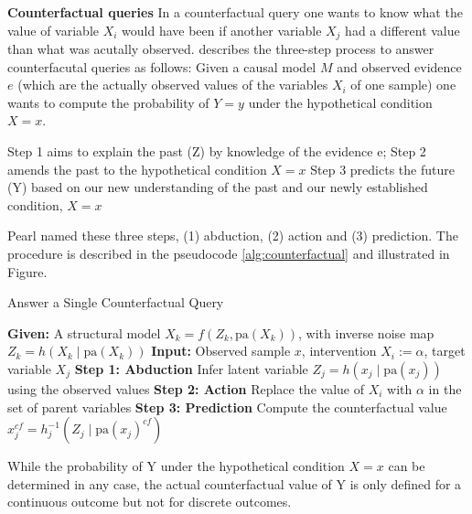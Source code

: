 \textbf{Counterfactual queries} In a counterfactual query one wants to know what the value of variable $X_i$ would have been if another variable $X_j$ had a different value than what was acutally observed. \citet{pearl_book2009} describes the three-step process to answer counterfacutal queries as follows: Given a causal model $M$ and observed evidence $e$ (which are the actually observed values of the variables $X_i$ of one sample) one wants to compute the probability of $Y=y$ under the hypothetical condition $X=x$.

Step 1 aims to explain the past (Z) by knowledge of the evidence e; 
Step 2 amends the past to the hypothetical condition $X=x$ 
Step 3 predicts the future (Y) based on our new understanding of the past and our newly established condition, $X =x$

Pearl named these three steps, (1) abduction,  (2) action and (3) prediction. The procedure is described in the pseudocode \ref{alg:counterfactual} and illustrated in Figure.

\begin{algorithm}
\caption{Answer a Single Counterfactual Query}
\label{alg:single_cf}
\begin{algorithmic}[1]
\State \textbf{Given:} A structural model $X_k = f(Z_k, \text{pa}(X_k))$, with inverse noise map $Z_k = h(X_k \mid \text{pa}(X_k))$
\State \textbf{Input:} Observed sample $x$, intervention $X_i := \alpha$, target variable $X_j$
\vspace{0.3em}
\State \textbf{Step 1: Abduction} Infer latent variable $Z_j = h(x_j \mid \text{pa}(x_j))$ using the observed values
\vspace{0.3em}
\State \textbf{Step 2: Action} Replace the value of $X_i$ with $\alpha$ in the set of parent variables
\vspace{0.3em}
\State \textbf{Step 3: Prediction} Compute the counterfactual value $x_j^{cf} = h_j^{-1}(Z_j \mid \text{pa}(x_j)^{cf})$
\vspace{0.3em}
\end{algorithmic}
\end{algorithm}



While the probability of Y under the hypothetical condition $X=x$ can be determined in any case, the actual counterfactual value of Y is only defined for a continuous outcome but not for discrete outcomes.


